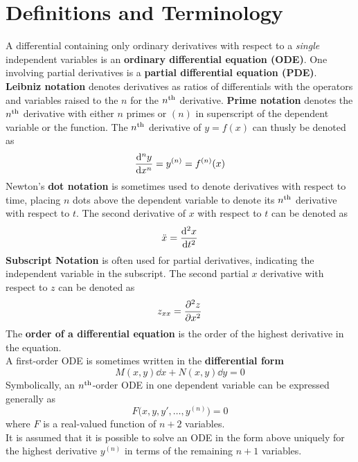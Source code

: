 \documentclass[../Differential Equations.tex]{subfiles}
\begin{document}
	\section{Definitions and Terminology}
			A differential containing only ordinary derivatives with respect to a \textit{single} independent variables is an \textbf{ordinary differential equation (ODE)}. One involving partial derivatives is a \textbf{partial differential equation (PDE)}.
			\textbf{Leibniz notation} denotes derivatives as ratios of differentials with the operators and variables raised to the \(n\) for the \(n^{\text{th}}\) derivative.
			\textbf{Prime notation} denotes the \(n^{\text{th}}\) derivative with either \(n\) primes or \((n)\) in superscript of the dependent variable or the function. The \(n^{\text{th}}\) derivative of $y = f(x)$ can thusly be denoted as
				\[\dv[n]{y}{x} = y^{(n)} = f^{(n)}(x)\]
			Newton's \textbf{dot notation} is sometimes used to denote derivatives with respect to time, placing \(n\) dots above the dependent variable to denote its \(n^{\text{th}}\) derivative with respect to \(t\). The second derivative of \(x\) with respect to \(t\) can be denoted as
				\[\ddot{x} = \dv[2]{x}{t}\]
			\textbf{Subscript Notation} is often used for partial derivatives, indicating the independent variable in the subscript. The second partial \(x\) derivative with respect to \(z\) can be denoted as
				\[z_{xx} = \pdv[2]{z}{x}\]
			The \textbf{order of a differential equation} is the order of the highest derivative in the equation. \\
			A first-order ODE is sometimes written in the \textbf{differential form}
				\[M(x, y)\dd{x} + N(x, y)\dd{y} = 0\]
			Symbolically, an \(n^{\text{th}}\)-order ODE in one dependent variable can be expressed generally as
				\[F\bigl(x, y, y', \ldots, y^{(n)}\bigr) = 0\]
				where \(F\) is a real-valued function of \(n + 2\) variables. \\
			It is assumed that it is possible to solve an ODE in the form above uniquely for the highest derivative \(y^(n)\) in terms of the remaining \(n + 1\) variables. \\
\end{document}

